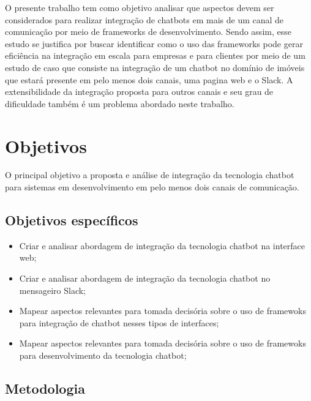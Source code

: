 O presente trabalho tem como
objetivo analisar que aspectos devem ser
considerados para realizar integração de chatbots em mais de um canal de comunicação por meio de frameworks de desenvolvimento. Sendo assim, esse estudo se justifica por buscar identificar como
o uso das frameworks pode gerar eficiência na integração em escala para empresas e para clientes por meio de um estudo de caso que consiste na integração de um chatbot no domínio de imóveis que estará presente em pelo menos dois canais, uma pagina web e o Slack. A extensibilidade da integração proposta para outros canais e seu grau de dificuldade também é um problema abordado neste trabalho.
 






\section{Objetivos}

O principal objetivo a proposta e análise de integração da tecnologia chatbot para sistemas em desenvolvimento em pelo menos dois canais de comunicação.

\subsection{Objetivos específicos}

\begin{itemize}

    \item Criar e analisar abordagem de integração da tecnologia chatbot na interface web;
    \item  Criar e analisar abordagem de integração da tecnologia chatbot no mensageiro Slack;
    \item Mapear aspectos relevantes para tomada decisória sobre o uso de framewoks para integração de chatbot nesses tipos de interfaces;
    
    \item Mapear aspectos relevantes para tomada decisória sobre o uso de framewoks para desenvolvimento da tecnologia chatbot;
    
\end{itemize}

\subsection{Metodologia}

